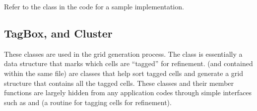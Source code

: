 \documentclass[letterpaper,10pt,english]{sphinxmanual}
\begin{document}
\sphinxAtStartPar
Refer to the  class in the
code for a sample implementation.


\subsection{TagBox, and Cluster}
\label{\detokenize{AmrCore:tagbox-and-cluster}}
\sphinxAtStartPar
These classes are used in the grid generation process.
The  class is essentially a data structure that marks which
cells are “tagged” for refinement.
 (and  contained within the same file) are classes
that help sort tagged cells and generate a grid structure that contains all
the tagged cells. These classes and their member functions are largely
hidden from any application codes through simple interfaces
such as  and  (a routine for tagging cells for refinement).
\end{document}
